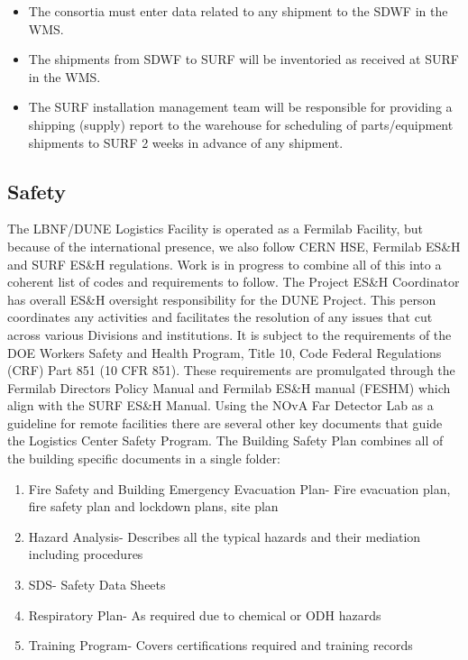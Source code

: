 \begin{itemize}
\item The consortia must enter data related to any shipment to the SDWF in the WMS.
\item The shipments from SDWF to SURF will be inventoried as received at SURF in the WMS.
\item The SURF installation management team will be responsible for providing a shipping (supply) report to the warehouse for scheduling of parts/equipment shipments to SURF 2 weeks in advance of any shipment.
\end{itemize}







\subsection{Safety}
\label{sec:fdsp-tc-itf-safety}

The LBNF/DUNE Logistics Facility is operated as a Fermilab Facility, but because of the international presence, we also follow CERN HSE, Fermilab ES\&H and SURF ES\&H regulations.  Work is in progress to combine all of this into a coherent list of codes and requirements to follow. The  Project ES\&H Coordinator has overall ES\&H oversight responsibility for the DUNE Project.  This person coordinates any activities and facilitates the resolution of any issues that cut across various Divisions and institutions. It is subject to the requirements of the DOE Workers Safety and Health Program, Title 10, Code Federal Regulations (CRF) Part 851 (10 CFR 851). These requirements are promulgated through the Fermilab Directors Policy Manual and Fermilab ES\&H manual (FESHM) which align with the SURF ES\&H Manual. 
Using the NOvA Far Detector Lab as a guideline for remote facilities there are several other key documents that guide the Logistics Center Safety Program.  The Building Safety Plan combines all of the building specific documents in a single folder:

\begin{enumerate}
\item	Fire Safety and Building Emergency Evacuation Plan- Fire evacuation plan, fire safety plan and lockdown plans, site plan
\item	Hazard Analysis- Describes all the typical hazards and their mediation including procedures 
\item	SDS- Safety Data Sheets
\item	Respiratory Plan- As required due to chemical or ODH hazards
\item	Training Program- Covers certifications required and  training records
\end{enumerate}

